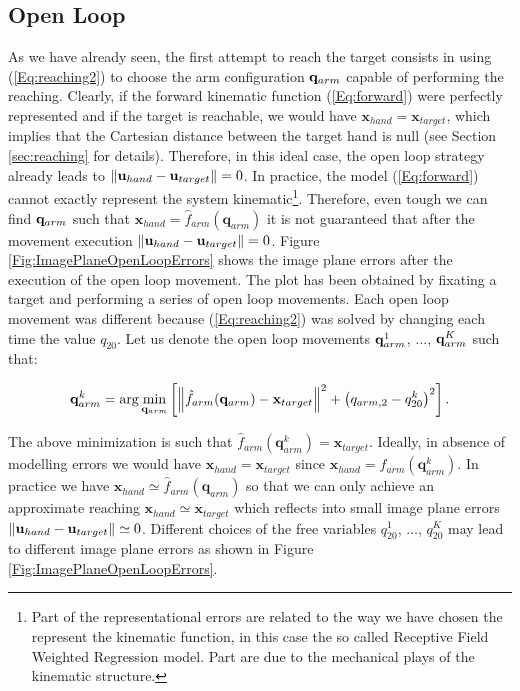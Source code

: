 \subsection{Open Loop}
As we have already seen, the first attempt to reach the target consists in using (\ref{Eq:reaching2})
to choose the arm configuration $\mathbf q_{arm}$ capable of performing the reaching. Clearly, if the forward 
kinematic function (\ref{Eq:forward}) were perfectly represented and if the target is reachable, we would have $\mathbf x_{hand} =  \mathbf x_{target}$, which implies that the Cartesian distance between the target hand
 is null (see Section \ref{sec:reaching} for details). Therefore, in this ideal case, the open loop 
 strategy already leads to $\| \mathbf{u}_{hand} - \mathbf{u}_{target} \| = 0$. In practice, the model 
 (\ref{Eq:forward}) cannot exactly represent the system kinematic\footnote{Part of the representational 
 errors are related to the way we have chosen the represent the kinematic function, in this case the
 so called Receptive Field Weighted Regression model. Part are due to the mechanical plays of the
 kinematic structure.}. Therefore, even tough we can find $\mathbf q_{arm}$ such that $\mathbf x_{hand}=
 \hat f_{arm}(\mathbf q_{arm})$ it is not guaranteed that after the movement execution 
 $\| \mathbf{u}_{hand} - \mathbf{u}_{target} \| = 0$. Figure \ref{Fig:ImagePlaneOpenLoopErrors}
 shows the image plane errors after the execution of the open loop movement. The plot has been obtained
 by fixating a target and performing a series of open loop movements. Each open loop
 movement was different because (\ref{Eq:reaching2}) was solved 
 by changing each time the value $q_{20}$. Let us denote the open loop movements $\mathbf q_{arm}^1$, $\dots$, 
 $\mathbf q_{arm}^K$ such that:
 
 \begin{eqnarray} \label{Eq:OpenLoopMovements}
 \mathbf q_{arm}^k = \arg \min_{\mathbf q_{arm}}
  \left[
  \left\| \hat f_{arm}(\mathbf q_{arm}) - \mathbf x_{target}\right\|^2 + \left(q_{arm,2}-q_{20}^k\right)^2
  \right].
 \end{eqnarray}
 
 The above minimization is such that $\hat f_{arm}(\mathbf q_{arm}^k) = \mathbf x_{target}$. Ideally, in absence
 of modelling errors we would have $ \mathbf x_{hand} = \mathbf x_{target}$ since $\mathbf x_{hand} = f_{arm}(\mathbf q_{arm}^k)$. In practice we have $\mathbf x_{hand} \simeq \hat f_{arm}(\mathbf q_{arm})$ 
 so that we can only achieve an approximate reaching $ \mathbf x_{hand} \simeq \mathbf x_{target}$ 
 which reflects into small image plane errors $\| \mathbf{u}_{hand} - \mathbf{u}_{target}\| \simeq 0$. Different choices 
 of the free variables $q_{20}^1$, $\dots$, $q_{20}^K$ may lead to different image plane errors as shown 
 in Figure \ref{Fig:ImagePlaneOpenLoopErrors}.



